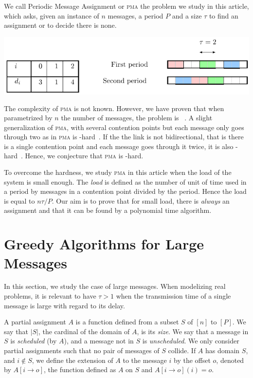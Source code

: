 \documentclass[10pt, conference, letterpaper]{IEEEtran}
\newcommand\pma{\textsc{pma}\xspace}
\begin{document}
We call Periodic Message Assignment or \pma the problem we study in this article,
which asks, given an instance of $n$ messages, a period $P$ and a size $\tau$ to find 
an assignment or to decide there is none.
\begin{center}
\includegraphics[scale=0.7]{instance}
\end{center}
The complexity of \pma is not known. However, we have proven that when parametrized by
$n$ the number of messages, the problem is \FPT~\cite{barth2018deterministic}.
A slight generalization of \pma, with several contention points but each message only goes through two as in \pma is \NP-hard~\cite{barth2018deterministic}. If the the link is not bidirectional, that is there is a single contention point and each message goes through it twice, it is also \NP-hard~\cite{}. Hence, we conjecture that \pma is \NP-hard.

To overcome the hardness, we study \pma in this article when the load of the system is small enough. The \emph{load} is defined as the number of unit of time used in a period by messages in a contention point divided by the period. Hence the load is equal to $n\tau /P$.
Our aim is to prove that for small load, there is \emph{always} an assignment and that it can be found by a polynomial time algorithm.


\section{Greedy Algorithms for Large Messages}

In this section, we study the case of large messages. When modelizing real problems,
it is relevant to have $\tau > 1$ when the transmission time of a single message is large with regard to its delay.


A partial assignment $A$ is a function defined from a subset $S$ of $[n]$ to $[P]$.
We say that $|S|$, the cardinal of the domain of $A$, is its \emph{size}.
We say that a message in $S$ is \emph{scheduled} (by $A$), and a message not in $S$ is \emph{unscheduled}. We only consider partial assignments such that no pair of messages of $S$ collide. If $A$ has domain $S$, and $i \notin S$, we define the extension of $A$ to the message $i$ by the offset $o$, denoted by $A[i \rightarrow o]$, the function defined as $A$ on $S$ and $A[i \rightarrow o](i) = o$.
\end{document}

